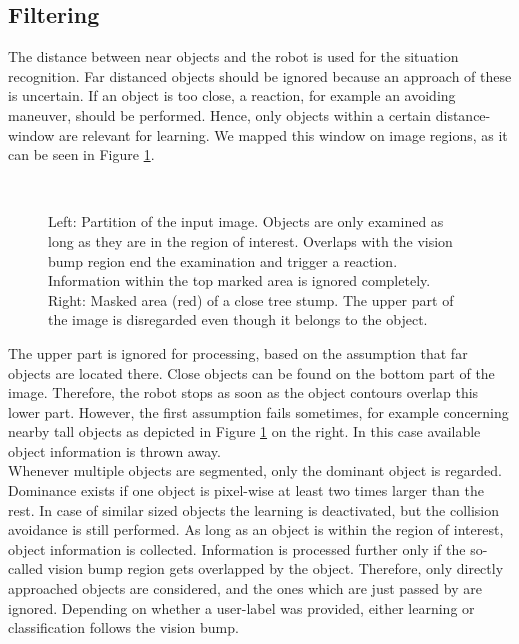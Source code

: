 \documentclass[conference]{IEEEtran}
\begin{document}
\subsection{Filtering}
The distance between near objects and the robot is used for the situation recognition. 
Far distanced objects should be ignored because an approach of these is uncertain. If an object is too close, a reaction, for example an avoiding maneuver, should be performed. 
Hence, only objects within a certain distance-window are relevant for learning. We mapped this window on image regions, 
as it can be seen in Figure \ref{attentionField}.
\begin{figure}
\centering
{}~
\caption{Left: Partition of the input image. Objects are only examined as long as they are in the region of interest. Overlaps with the vision
bump region end the examination and trigger a reaction. Information within the top marked area is ignored completely.
Right:
Masked area (red) of a close tree stump. The upper part of the image is disregarded even though it belongs to the object.
}
\label{attentionField}
\end{figure}
The upper part is ignored for processing, based on the assumption that far objects are located there. 
Close objects can be found on the bottom part of the image. Therefore, the robot stops as soon as the object contours overlap this lower part.
However, the first assumption fails sometimes, for example concerning nearby tall objects as depicted in Figure \ref{attentionField} on the right.
In this case available object information is thrown away. \\
Whenever multiple objects are segmented, only the dominant object is regarded. Dominance exists if one object is pixel-wise at least two times larger than the rest.
In case of similar sized objects the learning is deactivated, but the collision avoidance is still performed.
As long as an object is within the region of interest, object information is collected. Information is processed further only if the so-called 
vision bump region gets overlapped by the object. 
Therefore, only directly approached objects are considered, and the ones which are just passed by are ignored. 
Depending on whether a user-label was provided, either learning or classification follows the vision bump.
\end{document}
